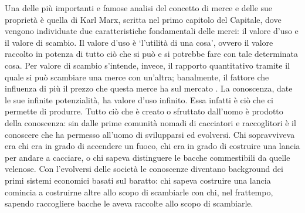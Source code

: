 Una delle più importanti e famose analisi del concetto di merce e delle sue proprietà
è quella di Karl Marx, scritta nel primo capitolo del Capitale, dove vengono individuate due
caratteristiche fondamentali delle merci: il valore d’uso e il valore di scambio. Il valore d’uso
è ‘l’utilità di una cosa’, ovvero il valore raccolto in potenza di tutto ciò che si può e si potrebbe
fare con tale determinata cosa. Per valore di scambio s’intende, invece, il rapporto
quantitativo tramite il quale si può scambiare una merce con un’altra; banalmente, il fattore
che influenza di più il prezzo che questa merce ha sul mercato \parencite{marx}. La conoscenza,
date le sue infinite potenzialità, ha valore d’uso infinito. Essa infatti è ciò che ci permette di
produrre. Tutto ciò che è creato o sfruttato dall’uomo è prodotto della conoscenza: sin dalle
prime comunità nomadi di cacciatori e raccoglitori è il conoscere che ha permesso all’uomo
di svilupparsi ed evolversi. Chi sopravviveva era chi era in grado di accendere un fuoco, chi
era in grado di costruire una lancia per andare a cacciare, o chi sapeva distinguere le bacche
commestibili da quelle velenose. Con l’evolversi delle società le conoscenze diventano
background dei primi sistemi economici basati sul baratto: chi sapeva costruire una lancia
comincia a costruirne altre allo scopo di scambiarle con chi, nel frattempo, sapendo
raccogliere bacche le aveva raccolte allo scopo di scambiarle.

